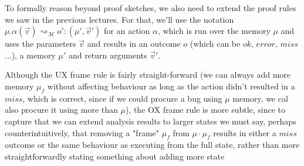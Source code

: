 \documentclass[11pt]{article}
\begin{document}
To formally reason beyond proof sketches, we also need to extend the proof rules we saw in the previous lectures. For that, we'll use the notation $\mu.\alpha(\vec{v})\rightsquigarrow_{\mathcal M} o':(\mu',\vec v')$ for an action $\alpha$, which is run over the memory $\mu$ and uses the parameters $\vec{v}$ and results in an outcome $o$ (which can be $ok$, $error$, $miss$...), a memory $\mu'$ and return arguments $\vec v'$.

\begin{figure}[H]
\end{figure}

Although the UX frame rule is fairly straight-forward (we can always add more memory $\mu_f$ without affecting behaviour as long as the action didn't resulted in a $miss$, which is correct, since if we could procure a bug using $\mu$ memory, we cal also procure it using more than $\mu$), the OX frame rule is more subtle, since to capture that we can extend
analysis results to larger states we must say, perhaps counterintuitively, that removing a "frame" $\mu_f$ from $\mu \cdot \mu_f$ results in either a $miss$ outcome or the same behaviour as executing from the full
state, rather than more straightforwardly stating something about adding more state\\
\end{document}

